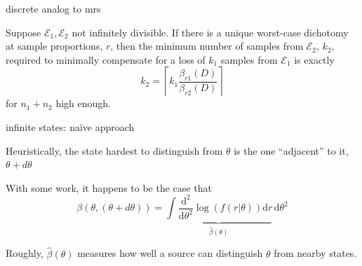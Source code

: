 \documentclass[square,]{gBakerBeamer}
\newcommand{\link}[2]{\boxed{\mbox{\hyperlink{#1}{\textcolor{solarizedBlue}{\textsc{#2}}}}}}
\renewcommand{\|}{\,|\,}
\newcommand{\D}{\mathrm{d}}
\begin{document}
\begin{frame}[label=discrete-mrs]{discrete analog to mrs}

  \begin{proposition}
    Suppose $\mathcal{E}_1, \mathcal{E}_2$ not infinitely divisible. If there is a unique worst-case dichotomy at sample proportions, $r$, then the minimum number of samples from $\mathcal{E}_2$, $k_2$, required to minimally compensate for a loss of $k_1$ samples from $\mathcal{E}_1$ is exactly
    \begin{equation*}
      k_2 = \left\lceil k_{1} \frac{\beta_{r1}(D)}{\beta_{r2}(D)} \right\rceil
    \end{equation*}
    for $n_1+n_2$ high enough.
  \end{proposition}
  \hfill\link{sims}{\huge back}
  \note{%

  }
\end{frame}

\begin{frame}[label=infinite-state-approach]{infinite states: na\"{i}ve approach}

  Heuristically, the state hardest to distinguish from $\theta$ is the
  one ``adjacent'' to it, $\theta+d\theta$\vspace{\baselineskip}

  With some work, it happens to be the case that
  \begin{equation*}
    \beta(\theta,(\theta+d\theta)) = \underbrace{\int
      \frac{\D ^2}{\D \theta^2}\log(f(r|\theta))\D r}_{\hat{\beta}(\theta)} \, \D \theta^2
  \end{equation*}

  Roughly, $\hat{\beta}(\theta)$ measures how well a source can
  distinguish $\theta$ from nearby states.


\end{frame}
\end{document}
